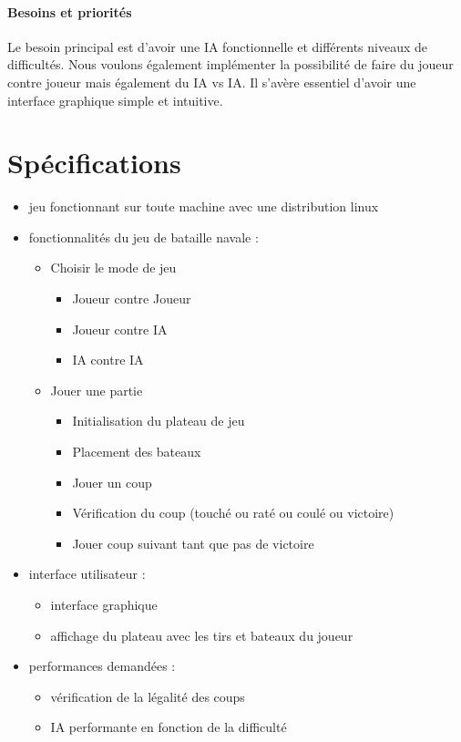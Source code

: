 \documentclass[a4paper,oneside]{article}
\begin{document}
\paragraph{Besoins et priorités\\}
Le besoin principal est d'avoir une IA fonctionnelle et différents niveaux de difficultés.
Nous voulons également implémenter la possibilité de faire du joueur contre joueur mais
également du IA vs IA.
Il s'avère essentiel d'avoir une interface graphique simple et intuitive.


\newpage

\section{Spécifications}

\begin{itemize}
    \item jeu fonctionnant sur toute machine avec une distribution linux
    \item fonctionnalités du jeu de bataille navale :
        \begin{itemize}
            \item Choisir le mode de jeu
            \begin{itemize}
            	\item Joueur contre Joueur
            	\item Joueur contre IA
            	\item IA contre IA
            \end{itemize}
            \item Jouer une partie
            \begin{itemize}
            	\item Initialisation du plateau de jeu
            	\item Placement des bateaux
            	\item Jouer un coup
            	\item Vérification du coup (touché ou raté ou coulé ou victoire)
            	\item Jouer coup suivant tant que pas de victoire
            \end{itemize}
        \end{itemize}
    \item interface utilisateur :
        \begin{itemize}
            \item interface graphique
            \item affichage du plateau avec les tirs et bateaux du joueur
        \end{itemize}
    \item performances demandées :
        \begin{itemize}
            \item vérification de la légalité des coups
            \item IA performante en fonction de la difficulté
        \end{itemize}
\end{itemize}
\end{document}
